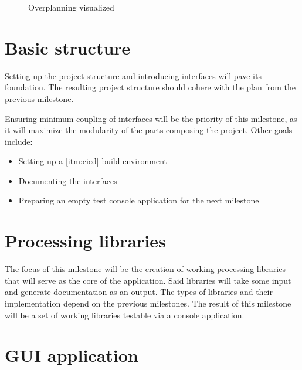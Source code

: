 \begin{figure}[H]
    \centering
    \caption{Overplanning visualized}
    \label{fig:overplanning}
\end{figure}

\section{Basic structure}

Setting up the project structure and introducing interfaces will pave its foundation. The resulting project structure should cohere with the plan from the previous milestone.

Ensuring minimum coupling of interfaces will be the priority of this milestone, as it will maximize the modularity of the parts composing the project.
Other goals include:
\begin{itemize}
    \item Setting up a \ref{itm:cicd} build environment
    \item Documenting the interfaces
    \item Preparing an empty test console application for the next milestone
\end{itemize}

\section{Processing libraries}

The focus of this milestone will be the creation of working processing libraries that will serve as the core of the application. Said libraries will take some input and generate documentation as an output. The types of libraries and their implementation depend on the previous milestones. The result of this milestone will be a set of working libraries testable via a console application.

\section{GUI application}